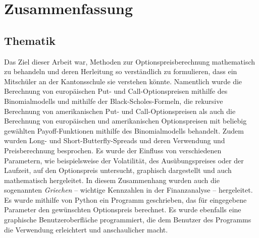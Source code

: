 \documentclass[11pt]{report} %
\begin{document}
\chapter{Zusammenfassung}
\section{Thematik}
Das Ziel dieser Arbeit war, Methoden zur Optionspreisberechnung mathematisch zu behandeln und deren Herleitung so verständlich zu formulieren, dass ein Mitschüler an der Kantonsschule sie verstehen könnte. Namentlich wurde die Berechnung von europäischen Put- und Call-Optionspreisen mithilfe des Binomialmodells und mithilfe der Black-Scholes-Formeln, die rekursive Berechnung von amerikanischen Put- und Call-Optionspreisen als auch die Berechnung von europäischen und amerikanischen Optionspreisen mit beliebig gewählten Payoff-Funktionen mithilfe des Binomialmodells behandelt. Zudem wurden Long- und Short-Butterfly-Spreads und deren Verwendung und Preisberechnung besprochen. Es wurde der Einfluss von verschiedenen Parametern, wie beispielsweise der Volatilität, des Ausübungspreises oder der Laufzeit, auf den Optionspreis untersucht, graphisch dargestellt und auch mathematisch hergeleitet. In diesem Zusammenhang wurden auch die sogenannten \textit{Griechen} -- wichtige Kennzahlen in der Finanzanalyse -- hergeleitet. Es wurde mithilfe von Python ein Programm geschrieben, das für eingegebene Parameter den gewünschten Optionspreis berechnet. Es wurde ebenfalls eine graphische Benutzeroberfläche programmiert, die dem Benutzer des Programms die Verwendung erleichtert und anschaulicher macht.
\end{document}
